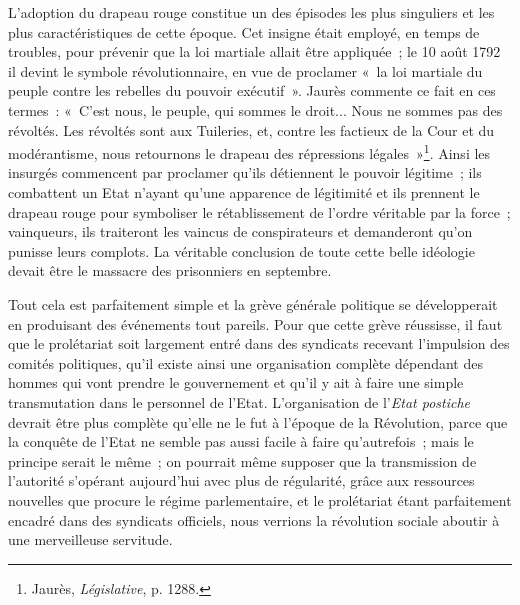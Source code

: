 \documentclass[french,twoside]{book} %
\begin{document}
L’adoption du drapeau rouge constitue un des épisodes les plus singuliers et les plus caractéristiques de cette époque. Cet insigne était employé, en temps de troubles, pour prévenir que la loi martiale allait être appliquée ; le 10 août 1792 il devint le symbole révolutionnaire, en vue de proclamer « la loi martiale du peuple contre les rebelles du pouvoir exécutif ». Jaurès commente ce fait en ces termes : « C’est nous, le peuple, qui sommes le droit... Nous ne sommes pas des révoltés. Les révoltés  sont aux Tuileries, et, contre les factieux de la Cour et du modérantisme, nous retournons le drapeau des répressions légales »\footnote{ \noindent Jaurès, \emph{Législative}, p. 1288.
 }. Ainsi les insurgés commencent par proclamer qu’ils détiennent le pouvoir légitime ; ils combattent un Etat n’ayant qu’une apparence de légitimité et ils prennent le drapeau rouge pour symboliser le rétablissement de l’ordre véritable par la force ; vainqueurs, ils traiteront les vaincus de conspirateurs et demanderont qu’on punisse leurs complots. La véritable conclusion de toute cette belle idéologie devait être le massacre des prisonniers en septembre.\par
Tout cela est parfaitement simple et la grève générale politique se développerait en produisant des événements tout pareils. Pour que cette grève réussisse, il faut que le prolétariat soit largement entré dans des syndicats recevant l’impulsion des comités politiques, qu’il existe ainsi une organisation complète dépendant des hommes qui vont prendre le gouvernement et qu’il y ait à faire une simple transmutation dans le personnel de l’Etat. L’organisation de l’\emph{Etat postiche} devrait être plus complète qu’elle ne le fut à l’époque de la Révolution, parce que la conquête de l’Etat ne semble pas aussi facile à faire qu’autrefois ; mais le principe serait le même ; on pourrait même supposer que la transmission de l’autorité s’opérant aujourd’hui avec plus de régularité, grâce aux ressources nouvelles que procure le régime parlementaire, et le prolétariat étant parfaitement encadré dans des syndicats officiels, nous verrions la révolution sociale aboutir à une merveilleuse servitude.
\end{document}
